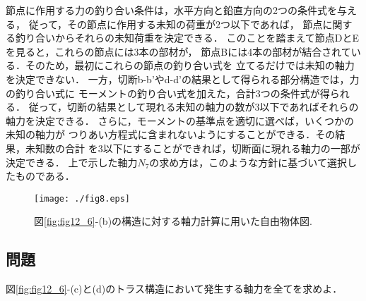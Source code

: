 \documentclass[10pt,a4j]{jbook}
\begin{document}
節点に作用する力の釣り合い条件は，水平方向と鉛直方向の2つの条件式を与える，
従って，その節点に作用する未知の荷重が2つ以下であれば，
節点に関する釣り合いからそれらの未知荷重を決定できる．
このことを踏まえて節点DとEを見ると，これらの節点には3本の部材が，
節点Bには4本の部材が結合されている．そのため，最初にこれらの節点の釣り合い式を
立てるだけでは未知の軸力を決定できない．
一方，切断b-b'やd-d'の結果として得られる部分構造では，力の釣り合い式に
モーメントの釣り合い式を加えた，合計3つの条件式が得られる．
従って，切断の結果として現れる未知の軸力の数が3以下であればそれらの軸力を決定できる．
さらに，モーメントの基準点を適切に選べば，いくつかの未知の軸力が
つりあい方程式に含まれないようにすることができる．その結果，未知数の合計
を3以下にすることができれば，切断面に現れる軸力の一部が決定できる．
上で示した軸力$N_7$の求め方は，このような方針に基づいて選択したものである．
\begin{figure}[h]
	\begin{center}
	\texttt{[image: ./fig8.eps]} 
	\end{center}
	\caption{
	図\ref{fig:fig12_6}-(b)の構造に対する軸力計算に用いた自由物体図.
	} 
	\label{fig:fig12_8}
\end{figure}
\subsection{問題}
図\ref{fig:fig12_6}-(c)と(d)のトラス構造において発生する軸力を全てを求めよ．
\end{document}
